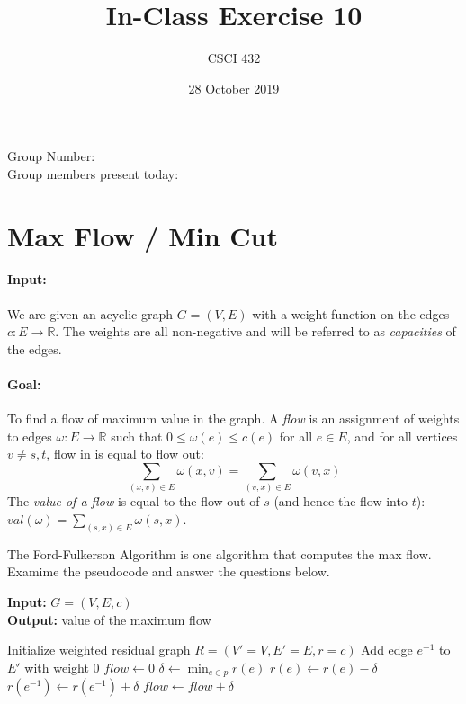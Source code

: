\documentclass{article}
\title{In-Class Exercise 10}
\author{CSCI 432}
\date{28 October 2019}
\def\R{{\mathbb R}}
\begin{document}
\maketitle

\noindent
Group Number:\\
Group members present today:

\section*{Max Flow / Min Cut}

\paragraph{Input:} We are given an acyclic graph $G=(V,E)$ with a weight function on the
edges $c \colon E \to \R$.  The weights are all non-negative and will be
referred to as \emph{capacities} of the edges.

\paragraph{Goal:} To find a flow of maximum value in the graph.  A \emph{flow}
is an assignment of weights to edges $\omega \colon E \to \R$ such that $0 \leq
\omega(e) \leq c(e)$ for all $e \in E$, and for all vertices $v \neq s,t$, flow
in is equal to flow out:
$$ \sum_{(x,v) \in E} \omega(x,v) = \sum_{(v,x) \in E} \omega(v,x) $$
The \emph{value of a flow} is equal to the flow out of
$s$ (and hence the flow into $t$): $val(\omega) = \sum_{(s,x) \in E}
\omega(s,x).$

The Ford-Fulkerson Algorithm is one algorithm that computes the max flow.
Examime the pseudocode and answer the questions below.

\begin{algorithm}
    {\bf Input:} $G=(V,E,c)$\\
    {\bf Output:} value of the maximum flow
    \begin{algorithmic}[1]
        \State Initialize weighted residual graph $R=(V'=V,E'=E,r=c)$
            \State Add edge $e^{-1}$ to $E'$ with weight $0$
        \EndFor
        \State $flow \gets 0$
            \State $\delta \gets \min_{e \in p} r(e)$
                \State $r(e) \gets r(e) - \delta$
                \State $r(e^{-1}) \gets r(e^{-1}) + \delta$
            \EndFor
            \State $flow \gets flow + \delta$
        \EndWhile
    \end{algorithmic}
\end{algorithm}
\end{document}
